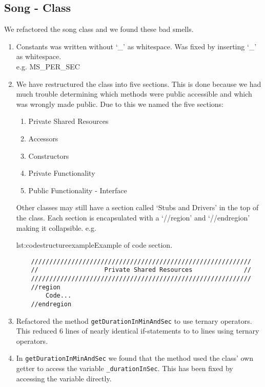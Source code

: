 \subsection*{Song - Class}
We refactored the song class and we found these bad smells.
\begin{enumerate}
	\item Constants was written without `_' as whitespace. Was fixed by inserting `_' as whitespace. \\ e.g. MS_PER_SEC

	\item We have restructured the class into five sections. This is done because we had much trouble determining which methods were public accessible and which was wrongly made public. Due to this we named the five sections:
	\begin{enumerate}
		\item Private Shared Resources
		\item Accessors
		\item Constructors
		\item Private Functionality
		\item Public Functionality - Interface
	\end{enumerate}
	Other classes may still have a section called `Stubs and Drivers' in the top of the class.
	Each section is encapsulated with a `//region' and `//endregion' making it collapsible. e.g.
	\begin{code}{lst:codestructureexample}{Example of code section.}
	\begin{lstlisting}
	////////////////////////////////////////////////////////////
	//                  Private Shared Resources              //
	////////////////////////////////////////////////////////////
	//region
		Code...
	//endregion
	\end{lstlisting}
	\end{code}
	
	\item Refactored the method \texttt{getDurationInMinAndSec} to use ternary operators. This reduced 6 lines of nearly identical if-statements to to lines using ternary operators.
	
	 \item In \texttt{getDurationInMinAndSec} we found that the method used the class' own getter to access the variable \texttt{_durationInSec}. This has been fixed by accessing the variable directly.

\end{enumerate}